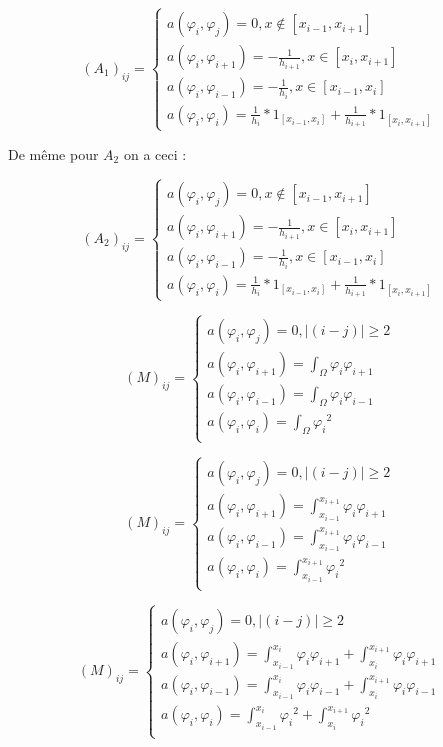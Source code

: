 \documentclass[12pt]{article}
\begin{document}
$$
(A_{1})_{ij} = 
\begin{cases}
a(\varphi_{i},\varphi_{j}) = 0 ,  x \notin [x_{i-1},x_{i+1}]  \\
a(\varphi_{i},\varphi_{i+1}) = -\frac{1}{h_{i+1}}  , x \in [x_{i},x_{i+1}] \\
a(\varphi_{i},\varphi_{i-1}) = -\frac{1}{h_{i}} , x \in [x_{i-1},x_{i}] \\
a(\varphi_{i},\varphi_{i}) =  \frac{1}{h_{i}}*1_{[x_{i-1},x_{i}]} + \frac{1}
{h_{i+1}}*1_{[x_{i},x_{i+1}]} 
\end{cases}
$$

De  même pour $ A_{2} $ on a ceci :

$$
(A_{2})_{ij} = 
\begin{cases}
a(\varphi_{i},\varphi_{j}) = 0 ,    x \notin [x_{i-1},x_{i+1}]  \\
a(\varphi_{i},\varphi_{i+1}) = -\frac{1}{h_{i+1}}  , x \in [x_{i},x_{i+1}] \\
a(\varphi_{i},\varphi_{i-1}) = -\frac{1}{h_{i}} , x \in [x_{i-1},x_{i}] \\
a(\varphi_{i},\varphi_{i}) =  \frac{1}{h_{i}}*1_{[x_{i-1},x_{i}]} + \frac{1}
{h_{i+1}}*1_{[x_{i},x_{i+1}]} 
\end{cases}
$$



$$
(M)_{ij} = 
\begin{cases}
a(\varphi_{i},\varphi_{j}) = 0 ,    |(i-j)| \ge 2 \\
a(\varphi_{i},\varphi_{i+1}) =  \int_{\Omega} \varphi _{i} \varphi _{i+1} \\
a(\varphi_{i},\varphi_{i-1}) = \int_{\Omega} \varphi _{i} \varphi_{i-1}  \\
a(\varphi_{i},\varphi_{i}) = \int_{\Omega}  {\varphi _{i}}^2   \\
\end{cases}
$$

$$
(M)_{ij} = 
\begin{cases}
a(\varphi_{i},\varphi_{j}) = 0 ,    |(i-j)| \ge 2 \\
a(\varphi_{i},\varphi_{i+1}) = \int_{x_{i-1}}^{x_{i+1}} \varphi _{i} \varphi _{i+1} \\
a(\varphi_{i},\varphi_{i-1}) = \int_{x_{i-1}}^{x_{i+1}} \varphi _{i} \varphi _{i-1}  \\
a(\varphi_{i},\varphi_{i}) = \int_{x_{i-1}}^{x_{i+1}}  {\varphi _{i}}^2   \\
\end{cases}
$$

$$
(M)_{ij} = 
\begin{cases}
a(\varphi_{i},\varphi_{j}) = 0 ,    |(i-j)| \ge 2 \\
a(\varphi_{i},\varphi_{i+1}) = 
\int_{x_{i-1}}^{x_{i}} \varphi _{i} \varphi _{i+1} + \int_{x_{i}}^{x_{i+1}} \varphi _{i} \varphi _{i+1}  \\
a(\varphi_{i},\varphi_{i-1}) = 
\int_{x_{i-1}}^{x_{i}} \varphi _{i} \varphi _{i-1} + \int_{x_{i}}^{x_{i+1}} \varphi _{i} \varphi _{i-1}  \\
a(\varphi_{i},\varphi_{i}) = 
\int_{x_{i-1}}^{x_{i}}  {\varphi _{i}}^2 +  \int_{x_{i}}^{x_{i+1}}  {\varphi _{i}}^2\\
\end{cases}
$$
\end{document}
